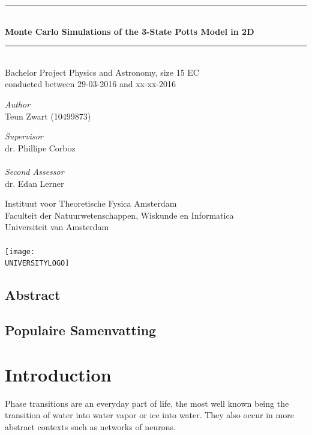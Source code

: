 \documentclass[11pt, a4paper]{report} %
\newcommand\TITLE{Monte Carlo Simulations of the 3-State Potts Model in 2D}
\newcommand\THESISFORM{Bachelor Project Physics and Astronomy, size 15 EC\\conducted between 29-03-2016 and xx-xx-2016}
\newcommand\INSTITUTE{Instituut voor Theoretische Fysica Amsterdam}
\newcommand\FACULTY{Faculteit der Natuurwetenschappen, Wiskunde en Informatica}
\newcommand\UNIVERSITY{Universiteit van Amsterdam}
\newcommand\AUTHOR{Teun Zwart (10499873)}
\newcommand\SUPERVISOR{dr. Phillipe Corboz}
\newcommand\SECONDASSESSOR{dr. Edan Lerner}
\newcommand\UNIVERSITYLOGO{UvA-logo.png} %
\begin{document}
\begin{titlepage}
	\begin{center}
		\rule{\textwidth}{0.4mm}\\[0.5cm]
		\huge{\textbf{\TITLE}}
		\rule{\textwidth}{0.4mm}\\[0.5cm]
		\large{\THESISFORM}\\[0.5cm]
		\begin{minipage}[t]{0.4\textwidth}
			\begin{flushleft}
				\large\emph{Author}\\{\AUTHOR}
			\end{flushleft}
		\end{minipage}
		\begin{minipage}[t]{0.4\textwidth}
			\begin{flushright}
				\large\emph{Supervisor}\\{\SUPERVISOR}\\~\\
				\large\emph{Second Assessor}\\{\SECONDASSESSOR}
			\end{flushright}
		\end{minipage}
		\vfill
		\large{\INSTITUTE}\\
		\large{\FACULTY}\\
		\large{\UNIVERSITY}\\~\\
		\texttt{[image: \\UNIVERSITYLOGO]}
	\end{center}
\end{titlepage}

\thispagestyle{plain}
\section*{Abstract}


\newpage
\thispagestyle{plain}
\section*{Populaire Samenvatting}


\tableofcontents

\chapter*{Introduction}
Phase transitions are an everyday part of life, the most well known being the transition of water into water vapor or ice into water.
They also occur in more abstract contexts such as networks of neurons.\cite{tkacik:2015}
\end{document}
